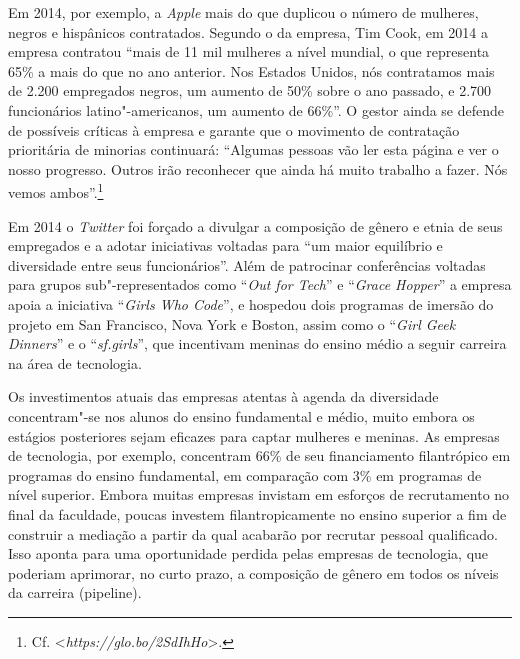 Em 2014, por exemplo, a \emph{Apple} mais do que duplicou o número de
mulheres, negros e hispânicos contratados. Segundo o  da empresa, Tim
Cook, em 2014 a empresa contratou ``mais de 11 mil mulheres a nível
mundial, o que representa 65\% a mais do que no ano anterior. Nos
Estados Unidos, nós contratamos mais de 2.200 empregados negros, um
aumento de 50\% sobre o ano passado, e 2.700 funcionários
latino"-americanos, um aumento de 66\%''. O gestor ainda se defende de
possíveis críticas à empresa e garante que o movimento de contratação
prioritária de minorias continuará: ``Algumas pessoas vão ler esta
página e ver o nosso progresso. Outros irão reconhecer que ainda há
muito trabalho a fazer. Nós vemos ambos''.\footnote{Cf.
  \textless{}\emph{https://glo.bo/2SdIhHo}\textgreater{}.}

Em 2014 o \emph{Twitter} foi forçado a divulgar a composição de gênero e
etnia de seus empregados e a adotar iniciativas voltadas para ``um maior
equilíbrio e diversidade entre seus funcionários''. Além de patrocinar
conferências voltadas para grupos sub"-representados como ``\emph{Out for
Tech}'' e ``\emph{Grace Hopper}'' a empresa apoia a iniciativa
``\emph{Girls Who Code}'', e hospedou dois programas de imersão do
projeto em San Francisco, Nova York e Boston, assim como o ``\emph{Girl
Geek Dinners}'' e o ``\emph{sf.girls}'', que incentivam meninas do
ensino médio a seguir carreira na área de tecnologia.

Os investimentos atuais das empresas atentas à agenda da diversidade
concentram"-se nos alunos do ensino fundamental e médio, muito embora os
estágios posteriores sejam eficazes para captar mulheres e meninas. As
empresas de tecnologia, por exemplo, concentram 66\% de seu
financiamento filantrópico em programas do ensino fundamental, em
comparação com 3\% em programas de nível superior. Embora muitas
empresas invistam em esforços de recrutamento no final da faculdade,
poucas investem filantropicamente no ensino superior a fim de construir
a mediação a partir da qual acabarão por recrutar pessoal qualificado.
Isso aponta para uma oportunidade perdida pelas empresas de tecnologia,
que poderiam aprimorar, no curto prazo, a composição de gênero em todos
os níveis da carreira (pipeline).

